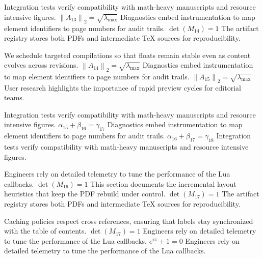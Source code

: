 \documentclass[12pt,a4paper,twocolumn]{article}
\newcommand{\paraid}[1]{\par\noindent\hypertarget{#1}{\ignorespaces}}
\begin{document}
\paraid{sec10-p3}Integration tests verify compatibility with math-heavy manuscripts and resource intensive figures. $\left\|A_{13}\right\|_{2} = \sqrt{\lambda_{\max}}$ Diagnostics embed instrumentation to map element identifiers to page numbers for audit trails. $\det(M_{14}) = 1$ The artifact registry stores both PDFs and intermediate TeX sources for reproducibility.
\par

\paraid{sec10-p4}We schedule targeted compilations so that floats remain stable even as content evolves across revisions. $\left\|A_{14}\right\|_{2} = \sqrt{\lambda_{\max}}$ Diagnostics embed instrumentation to map element identifiers to page numbers for audit trails. $\left\|A_{15}\right\|_{2} = \sqrt{\lambda_{\max}}$ User research highlights the importance of rapid preview cycles for editorial teams.
\par

\paraid{sec10-p5}Integration tests verify compatibility with math-heavy manuscripts and resource intensive figures. $\alpha_{15} + \beta_{16} = \gamma_{17}$ Diagnostics embed instrumentation to map element identifiers to page numbers for audit trails. $\alpha_{16} + \beta_{17} = \gamma_{18}$ Integration tests verify compatibility with math-heavy manuscripts and resource intensive figures.
\par

\paraid{sec10-p6}Engineers rely on detailed telemetry to tune the performance of the Lua callbacks. $\det(M_{16}) = 1$ This section documents the incremental layout heuristics that keep the PDF rebuild under control. $\det(M_{17}) = 1$ The artifact registry stores both PDFs and intermediate TeX sources for reproducibility.
\par

\paraid{sec10-p7}Caching policies respect cross references, ensuring that labels stay synchronized with the table of contents. $\det(M_{17}) = 1$ Engineers rely on detailed telemetry to tune the performance of the Lua callbacks. $e^{i\pi} + 1 = 0$ Engineers rely on detailed telemetry to tune the performance of the Lua callbacks.
\par
\end{document}
